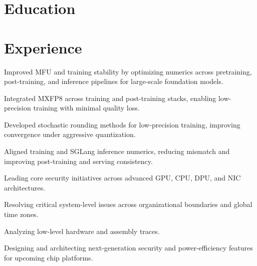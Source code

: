 \documentclass[]{deedy-resume-openfont}
\begin{document}
\begin{minipage}[t]{0.66\textwidth}

\section{Education}

\sectionsep

\section{Experience}

\vspace{\topsep}
\begin{tightemize}
\item Improved MFU and training stability by optimizing numerics across pretraining, post-training, and inference pipelines for large-scale foundation models.
\item Integrated MXFP8 across training and post-training stacks, enabling low-precision training with minimal quality loss.
\item Developed stochastic rounding methods for low-precision training, improving convergence under aggressive quantization.
\item Aligned training and SGLang inference numerics, reducing mismatch and improving post-training and serving consistency.
\end{tightemize}
\sectionsep

\vspace{\topsep}
\begin{tightemize}
\item Leading core security initiatives across advanced GPU, CPU, DPU, and NIC architectures.
\item Resolving critical system-level issues across organizational boundaries and global time zones.
\item Analyzing low-level hardware and assembly traces.
\item Designing and architecting next-generation security and power-efficiency features for upcoming chip platforms.
\end{tightemize}
\sectionsep


\end{minipage}
\end{document}
